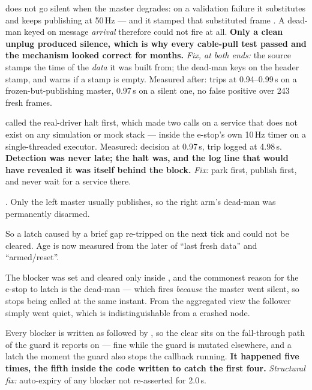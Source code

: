 { does not go silent when the master degrades: on a
validation failure it substitutes  and keeps publishing at
50\,Hz --- and it stamped that substituted frame . A dead-man keyed on
message \emph{arrival} therefore could not fire at all. \textbf{Only a clean
unplug produced silence, which is why every cable-pull test passed and the
mechanism looked correct for months.} \textit{Fix, at both ends:} the source
stamps the time of the \emph{data} it was built from; the dead-man keys on the
header stamp, and warns if a stamp is empty. Measured after: trips at
0.94--0.99\,s on a frozen-but-publishing master, 0.97\,s on a silent one, no
false positive over 243 fresh frames.}

{ called the real-driver halt first, which made two
 calls on a service that does not
exist on any simulation or mock stack --- inside the e-stop's own 10\,Hz timer
on a single-threaded executor. Measured: decision at 0.97\,s, trip logged at
4.98\,s. \textbf{Detection was never late; the halt was, and the log line that
would have revealed it was itself behind the block.} \textit{Fix:} park first,
publish  first, and never wait for a service there.}

{. Only the left master usually publishes, so the
right arm's dead-man was permanently disarmed.}

{So a latch caused by a brief gap re-tripped on the next tick and could not be
cleared. Age is now measured from the later of ``last fresh data'' and
``armed/reset''.}

{The  blocker was set and cleared only inside , and
the commonest reason for the e-stop to latch is the dead-man --- which fires
\emph{because} the master went silent, so  stops being called at
the same instant. From the aggregated view the follower simply went quiet,
which is indistinguishable from a crashed node.}

{Every blocker is written as  followed by
, so the clear sits on the fall-through path of the guard it
reports on --- fine while the guard is mutated elsewhere, and a latch the
moment the guard also stops the callback running. \textbf{It happened five
times, the fifth inside the code written to catch the first four.}
\textit{Structural fix:} auto-expiry of any blocker not re-asserted for 2.0\,s.}

